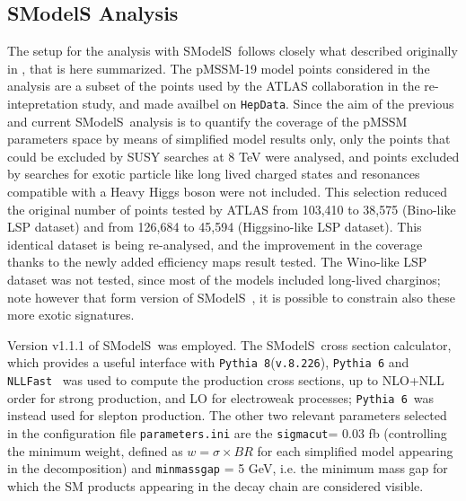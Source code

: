 \documentclass[a4paper,11pt]{article}
\newcommand{\SMO}{{\sc SModelS}}
\begin{document}
\subsection{SModelS Analysis}
The setup for the analysis with \SMO~follows closely what described originally in \cite{Ambrogi:2017lov}, that is here summarized. The pMSSM-19 model points considered in the analysis are a subset of the points used by the ATLAS collaboration in the re-intepretation study\cite{Aad:2015baa}, and made availbel on \texttt{HepData}\cite{ATLASpMSSMhepdata}. Since the aim of the previous and current \SMO~analysis is to quantify the coverage of the pMSSM parameters space by means of simplified model results only, only the points that could be excluded by SUSY searches at 8 TeV were analysed, and points excluded by searches for exotic particle like long lived charged states and resonances compatible with a Heavy Higgs boson were not included. This selection reduced the original number of points tested by ATLAS from 103,410 to 38,575 (Bino-like LSP dataset) and from 126,684 to 45,594 (Higgsino-like LSP dataset). This identical dataset is being re-analysed, and the improvement in the coverage thanks to the newly added efficiency maps result tested. {\color{red} The Wino-like LSP dataset was not tested, since most of the models included long-lived charginos; note however that form version of \SMO~, it is possible to constrain also these more exotic signatures}.

Version v1.1.1 of \SMO~was employed. The \SMO~cross section calculator, which provides a useful interface with \texttt{Pythia 8}(\texttt{v.8.226})\cite{Sjostrand:2014zea}, \texttt{Pythia 6}\cite{Sjostrand:2006za} and \texttt{NLLFast}~\cite{nllfast,Beenakker:1996ch,Kulesza:2008jb,Kulesza:2009kq,Beenakker:2009ha,Beenakker:2011fu,Beenakker:1997ut,Beenakker:2010nq} was used to compute the production cross sections, up to NLO+NLL order for strong production, and LO for electroweak processes; \texttt{Pythia 6}~was instead used for slepton production. The other two relevant parameters selected in the configuration file \texttt{parameters.ini} are the \texttt{sigmacut}= 0.03 fb (controlling the minimum weight, defined as $w = \sigma \times BR$ for each simplified model appearing in the decomposition) and \verb|minmassgap| = 5 GeV, i.e. the minimum mass gap for which the SM products appearing in the decay chain are considered visible.
\end{document}
